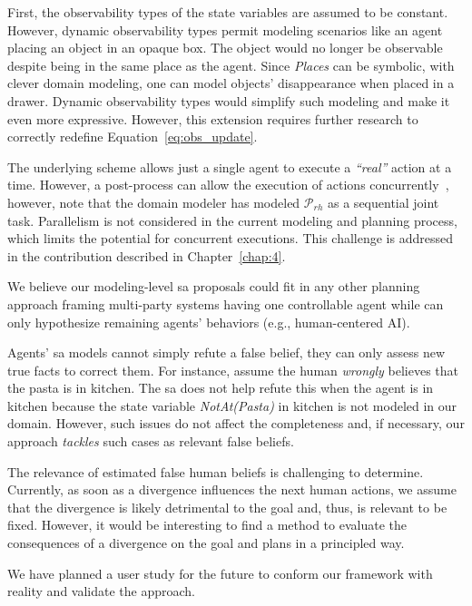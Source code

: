 {First, the observability types of the state variables are assumed to be constant. 
However, dynamic observability types permit modeling scenarios like an agent placing an object in an opaque box. The object would no longer be observable despite being in the same place as the agent. Since \textit{Places} can be symbolic, with clever domain modeling, one can model objects' disappearance when placed in a drawer. Dynamic observability types would simplify such modeling and make it even more expressive. However, this extension requires further research to correctly redefine Equation~\ref{eq:obs_update}. 

The underlying scheme allows just a single agent to execute a \textit{``real''} action at a time. 
However, a post-process can allow the execution of actions concurrently~\cite{CrosbyJR14}, however, note that the domain modeler has modeled $\mathcal{P}_{rh}$ as a sequential joint task. 
Parallelism is not considered in the current modeling and planning process, which limits the potential for concurrent executions. This challenge is addressed in the contribution described in Chapter~\ref{chap:4}.

We believe our modeling-level \acrshort{sa} proposals could fit in any other planning approach framing multi-party systems having one controllable agent while can only hypothesize remaining agents' behaviors (e.g., human-centered AI).

Agents' \acrshort{sa} models cannot simply refute a false belief, they can only assess new true facts to correct them.
For instance, assume the human \textit{wrongly} believes that the pasta is in \textsf{kitchen}. The \acrshort{sa} does not help refute this when the agent is in \textsf{kitchen}
because the state variable \textit{NotAt(Pasta)} in \textsf{kitchen} is not modeled in our domain.  
However, such issues do not affect the completeness and, if necessary, our approach \textit{tackles} such cases as relevant false beliefs.

The relevance of estimated false human beliefs is challenging to determine. Currently, as soon as a divergence influences the next human actions, we assume that the divergence is likely detrimental to the goal and, thus, is relevant to be fixed. However, it would be interesting to find a method to evaluate the consequences of a divergence on the goal and plans in a principled way.

We have planned a user study for the future to conform our framework with reality and validate the approach.

}
